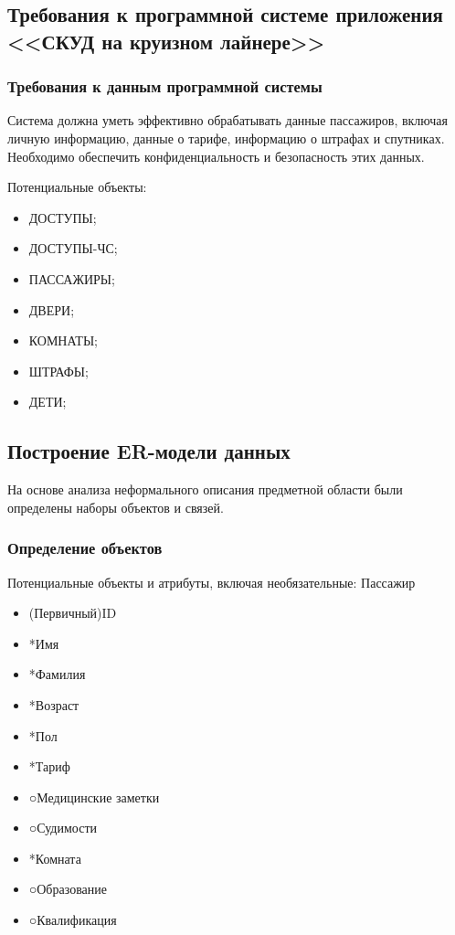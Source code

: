 \subsection{Требования к программной системе приложения <<СКУД на круизном лайнере>>}
\subsubsection{Требования к данным программной системы}

Система должна уметь эффективно обрабатывать данные пассажиров, включая личную информацию, данные о тарифе, информацию о штрафах и спутниках. Необходимо обеспечить конфиденциальность и безопасность этих данных.

Потенциальные объекты:
\begin{itemize}
	\item ДОСТУПЫ;
	\item ДОСТУПЫ-ЧС;
	\item ПАССАЖИРЫ;
	\item ДВЕРИ;
	\item КОМНАТЫ;
	\item ШТРАФЫ;
	\item ДЕТИ;
\end{itemize}


\subsection{Построение ER-модели данных}

На основе анализа неформального описания предметной области были определены наборы объектов и связей.

\subsubsection {Определение объектов}

Потенциальные объекты и атрибуты, включая необязательные:
Пассажир
\begin{itemize}
	\item (Первичный)ID
	\item *Имя
	\item *Фамилия
	\item *Возраст
	\item *Пол
	\item *Тариф
	\item ○Медицинские заметки
	\item ○Судимости
	\item *Комната
	\item ○Образование 
	\item ○Квалификация	
\end{itemize}

